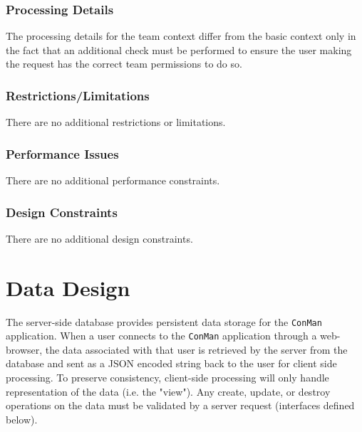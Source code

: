\documentclass{article}
\begin{document}
\subsubsection{Processing Details}
The processing details for the team context differ from the basic context only in the fact that an additional check must be performed to ensure the user making the request has the correct team permissions to do so.
\subsubsection{Restrictions/Limitations}
There are no additional restrictions or limitations.
\subsubsection{Performance Issues}
There are no additional performance constraints.
\subsubsection{Design Constraints}
There are no additional design constraints.

%
%
%
%


\newpage
\section{Data Design}
The server-side database provides persistent data storage for the \texttt{ConMan} application.
When a user connects to the \texttt{ConMan} application through a web-browser, the data associated with that user is retrieved by the server from the database and sent as a JSON encoded string back to the user for client side processing.
To preserve consistency, client-side processing will only handle representation of the data (i.e. the "view").
Any create, update, or destroy operations on the data must be validated by a server request (interfaces defined below).
\end{document}
